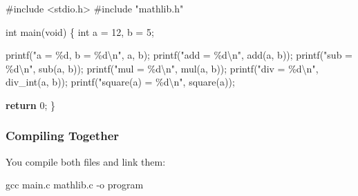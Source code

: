 \documentclass[
  letterpaper,
  DIV=11,
  numbers=noendperiod]{scrreprt}
\newenvironment{Shaded}{\begin{snugshade}}{\end{snugshade}}
\newcommand{\AttributeTok}[1]{\textcolor[rgb]{0.40,0.45,0.13}{#1}}
\newcommand{\ControlFlowTok}[1]{\textcolor[rgb]{0.00,0.23,0.31}{\textbf{#1}}}
\newcommand{\DataTypeTok}[1]{\textcolor[rgb]{0.68,0.00,0.00}{#1}}
\newcommand{\DecValTok}[1]{\textcolor[rgb]{0.68,0.00,0.00}{#1}}
\newcommand{\FunctionTok}[1]{\textcolor[rgb]{0.28,0.35,0.67}{#1}}
\newcommand{\ImportTok}[1]{\textcolor[rgb]{0.00,0.46,0.62}{#1}}
\newcommand{\NormalTok}[1]{\textcolor[rgb]{0.00,0.23,0.31}{#1}}
\newcommand{\OperatorTok}[1]{\textcolor[rgb]{0.37,0.37,0.37}{#1}}
\newcommand{\PreprocessorTok}[1]{\textcolor[rgb]{0.68,0.00,0.00}{#1}}
\newcommand{\SpecialCharTok}[1]{\textcolor[rgb]{0.37,0.37,0.37}{#1}}
\newcommand{\StringTok}[1]{\textcolor[rgb]{0.13,0.47,0.30}{#1}}
\begin{document}
\begin{Shaded}
\begin{Highlighting}[]
\PreprocessorTok{\#include }\ImportTok{\textless{}stdio.h\textgreater{}}
\PreprocessorTok{\#include }\ImportTok{"mathlib.h"}

\DataTypeTok{int}\NormalTok{ main}\OperatorTok{(}\DataTypeTok{void}\OperatorTok{)} \OperatorTok{\{}
    \DataTypeTok{int}\NormalTok{ a }\OperatorTok{=} \DecValTok{12}\OperatorTok{,}\NormalTok{ b }\OperatorTok{=} \DecValTok{5}\OperatorTok{;}

\NormalTok{    printf}\OperatorTok{(}\StringTok{"a = }\SpecialCharTok{\%d}\StringTok{, b = }\SpecialCharTok{\%d\textbackslash{}n}\StringTok{"}\OperatorTok{,}\NormalTok{ a}\OperatorTok{,}\NormalTok{ b}\OperatorTok{);}
\NormalTok{    printf}\OperatorTok{(}\StringTok{"add = }\SpecialCharTok{\%d\textbackslash{}n}\StringTok{"}\OperatorTok{,}\NormalTok{ add}\OperatorTok{(}\NormalTok{a}\OperatorTok{,}\NormalTok{ b}\OperatorTok{));}
\NormalTok{    printf}\OperatorTok{(}\StringTok{"sub = }\SpecialCharTok{\%d\textbackslash{}n}\StringTok{"}\OperatorTok{,}\NormalTok{ sub}\OperatorTok{(}\NormalTok{a}\OperatorTok{,}\NormalTok{ b}\OperatorTok{));}
\NormalTok{    printf}\OperatorTok{(}\StringTok{"mul = }\SpecialCharTok{\%d\textbackslash{}n}\StringTok{"}\OperatorTok{,}\NormalTok{ mul}\OperatorTok{(}\NormalTok{a}\OperatorTok{,}\NormalTok{ b}\OperatorTok{));}
\NormalTok{    printf}\OperatorTok{(}\StringTok{"div = }\SpecialCharTok{\%d\textbackslash{}n}\StringTok{"}\OperatorTok{,}\NormalTok{ div\_int}\OperatorTok{(}\NormalTok{a}\OperatorTok{,}\NormalTok{ b}\OperatorTok{));}
\NormalTok{    printf}\OperatorTok{(}\StringTok{"square(a) = }\SpecialCharTok{\%d\textbackslash{}n}\StringTok{"}\OperatorTok{,}\NormalTok{ square}\OperatorTok{(}\NormalTok{a}\OperatorTok{));}

    \ControlFlowTok{return} \DecValTok{0}\OperatorTok{;}
\OperatorTok{\}}
\end{Highlighting}
\end{Shaded}

\subsubsection{Compiling Together}\label{compiling-together}

You compile both files and link them:

\begin{Shaded}
\begin{Highlighting}[]
\FunctionTok{gcc}\NormalTok{ main.c mathlib.c }\AttributeTok{{-}o}\NormalTok{ program}
\end{Highlighting}
\end{Shaded}
\end{document}
